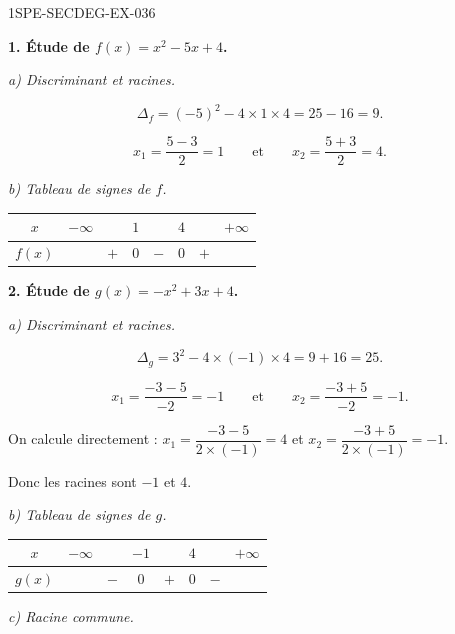 \begin{corrige}{1SPE-SECDEG-EX-036}

\textbf{1. Étude de $f(x) = x^2 - 5x + 4$.}

\textit{a) Discriminant et racines.}


\[\Delta_f = (-5)^2 - 4 \times 1 \times 4 = 25 - 16 = 9.\]

\[x_1 = \frac{5-3}{2} = 1 \qquad \text{et} \qquad x_2 = \frac{5+3}{2} = 4.\]

\textit{b) Tableau de signes de $f$.}


\medskip
\begin{center}
\begin{tabular}{|c|ccccccc|}
\hline
$x$ & $-\infty$ & & $1$ & & $4$ & & $+\infty$ \\
\hline
$f(x)$ & & $+$ & $0$ & $-$ & $0$ & $+$ & \\
\hline
\end{tabular}
\end{center}

\medskip
\textbf{2. Étude de $g(x) = -x^2 + 3x + 4$.}

\textit{a) Discriminant et racines.}


\[\Delta_g = 3^2 - 4 \times (-1) \times 4 = 9 + 16 = 25.\]

\[x_1 = \frac{-3 - 5}{-2} = -1 \qquad \text{et} \qquad x_2 = \frac{-3 + 5}{-2} = -1.\]

On calcule directement : $x_1 = \dfrac{-3-5}{2 \times (-1)} = 4$ et $x_2 = \dfrac{-3+5}{2\times(-1)} = -1$.

Donc les racines sont $-1$ et $4$.

\textit{b) Tableau de signes de $g$.}


\medskip
\begin{center}
\begin{tabular}{|c|ccccccc|}
\hline
$x$ & $-\infty$ & & $-1$ & & $4$ & & $+\infty$ \\
\hline
$g(x)$ & & $-$ & $0$ & $+$ & $0$ & $-$ & \\
\hline
\end{tabular}
\end{center}

\textit{c) Racine commune.}


\end{corrige}
